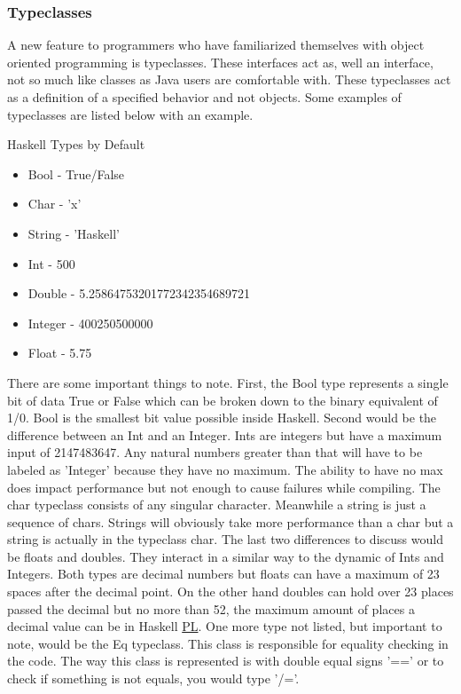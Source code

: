 \documentclass{article}
\begin{document}
    \subsubsection{Typeclasses}
    A new feature to programmers who have familiarized themselves with object oriented programming is typeclasses. These interfaces act as, well an interface, not so much like classes as Java users are comfortable with. These typeclasses act as a definition of a specified behavior and not objects. Some examples of typeclasses are listed below with an example.
    \medskip
    \medskip
    
    
    \caption{Haskell Types by Default}
    \begin{itemize}
              \item Bool - True/False
              \item Char - 'x'
              \item String - 'Haskell'
              \item Int - 500
              \item Double - 5.25864753201772342354689721
              \item Integer - 400250500000
              \item Float - 5.75
    \end{itemize}
    
    There are some important things to note. First, the Bool type represents a single bit of data True or False which can be broken down to the binary equivalent of 1/0. Bool is the smallest bit value possible inside Haskell. Second would be the difference between an Int and an Integer. Ints are integers but have a maximum input of 2147483647. Any natural numbers greater than that will have to be labeled as 'Integer' because they have no maximum. The ability to have no max does impact performance but not enough to cause failures while compiling. The char typeclass consists of any singular character. Meanwhile a string is just a sequence of chars. Strings will obviously take more performance than a char but a string is actually in the typeclass char. The last two differences to discuss would be floats and doubles. They interact in a similar way to the dynamic of Ints and Integers. Both types are decimal numbers but floats can have a maximum of 23 spaces after the decimal point. On the other hand doubles can hold over 23 places passed the decimal but no more than 52, the maximum amount of places a decimal value can be in Haskell \href{PL}{PL}. One more type not listed, but important to note, would be the Eq typeclass. This class is responsible for equality checking in the code. The way this class is represented is with double equal signs '==' or to check if something is not equals, you would type '/='.
            
\end{document}
